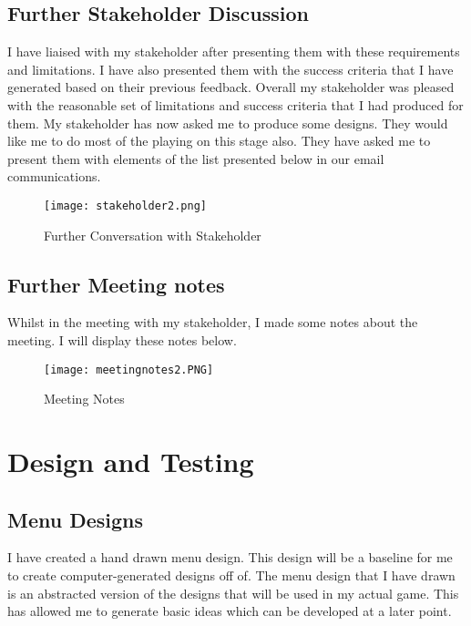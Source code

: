 \documentclass[12pt]{report}
\begin{document}
\normalsize

\pagebreak

\section{Further Stakeholder Discussion}
I have liaised with my stakeholder after presenting them with these requirements and limitations. I have also presented them with the success criteria that I have generated based on their previous feedback. Overall my stakeholder was pleased with the reasonable set of limitations and success criteria that I had produced for them. My stakeholder has now asked me to produce some designs. They would like me to do most of the playing on this stage also. They have asked me to present them with elements of the list presented below in our email communications.

\begin{figure}[h]
    \centering
    \texttt{[image: stakeholder2.png]}
    \caption{Further Conversation with Stakeholder}
    \label{stakeholder2}
\end{figure}

\pagebreak

\section{Further Meeting notes}
Whilst in the meeting with my stakeholder, I made some notes about the meeting. I will display these notes below.

\begin{figure}[H]
    \centering
    \texttt{[image: meetingnotes2.PNG]}
    \caption{Meeting Notes}
    \label{stakeholder2}
\end{figure}

\pagebreak

\chapter{Design and Testing}

\section{Menu Designs}
I have created a hand drawn menu design. This design will be a baseline for me to create computer-generated designs off of. The menu design that I have drawn is an abstracted version of the designs that will be used in my actual game. This has allowed me to generate basic ideas which can be developed at a later point.
\end{document}
